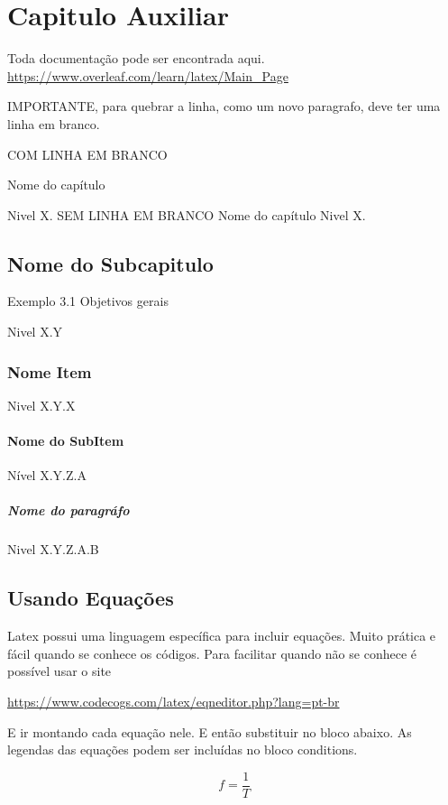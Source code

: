 \chapter{Capitulo Auxiliar}

Toda documentação pode ser encontrada aqui. \url{https://www.overleaf.com/learn/latex/Main_Page}

IMPORTANTE, para quebrar a linha, como um novo paragrafo, deve ter uma linha em branco.

COM LINHA EM BRANCO

Nome do capítulo

Nivel X.
SEM LINHA EM BRANCO 
Nome do capítulo
Nivel X.

\section{Nome do Subcapitulo}

Exemplo 3.1 Objetivos gerais

Nivel X.Y

\subsection{Nome Item}
Nivel X.Y.X


\subsubsection{Nome do SubItem}

Nível X.Y.Z.A

\paragraph{Nome do paragráfo}

Nivel X.Y.Z.A.B


\section{Usando Equações}

Latex possui uma linguagem específica para incluir equações. Muito prática e fácil quando se conhece os códigos. Para facilitar quando não se conhece é possível usar o site

\url{https://www.codecogs.com/latex/eqneditor.php?lang=pt-br}

E ir montando cada equação nele. E então substituir no bloco abaixo. As legendas das equações podem ser incluídas no bloco conditions. 

\begin{equation}\label{eq:freq_per}
    f=\frac{1}{T} %
\end{equation}%


